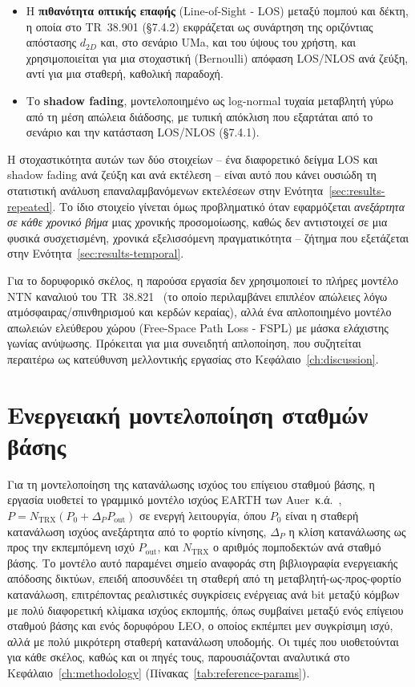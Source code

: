 \begin{itemize}
  \item Η \textbf{πιθανότητα οπτικής επαφής} (Line-of-Sight - LOS) μεταξύ
    πομπού και δέκτη, η οποία στο TR~38.901 (§7.4.2) εκφράζεται ως
    συνάρτηση της οριζόντιας απόστασης $d_{2D}$ και, στο σενάριο UMa, και
    του ύψους του χρήστη, και χρησιμοποιείται για μια στοχαστική
    (Bernoulli) απόφαση LOS/NLOS ανά ζεύξη, αντί για μια σταθερή, καθολική
    παραδοχή.
  \item Το \textbf{shadow fading}, μοντελοποιημένο ως log-normal
    τυχαία μεταβλητή γύρω από τη μέση απώλεια διάδοσης, με τυπική απόκλιση
    που εξαρτάται από το σενάριο και την κατάσταση LOS/NLOS (§7.4.1).
\end{itemize}

Η στοχαστικότητα αυτών των δύο στοιχείων -- ένα διαφορετικό δείγμα LOS και
shadow fading ανά ζεύξη και ανά εκτέλεση -- είναι αυτό που κάνει
ουσιώδη τη στατιστική ανάλυση επαναλαμβανόμενων εκτελέσεων στην
Ενότητα~\ref{sec:results-repeated}. Το ίδιο στοιχείο γίνεται όμως
προβληματικό όταν εφαρμόζεται \emph{ανεξάρτητα σε κάθε χρονικό βήμα} μιας
χρονικής προσομοίωσης, καθώς δεν αντιστοιχεί σε μια φυσικά συσχετισμένη,
χρονικά εξελισσόμενη πραγματικότητα -- ζήτημα που εξετάζεται στην
Ενότητα~\ref{sec:results-temporal}.

Για το δορυφορικό σκέλος, η παρούσα εργασία δεν χρησιμοποιεί το πλήρες
μοντέλο NTN καναλιού του TR~38.821~\cite{tr38821} (το οποίο περιλαμβάνει
επιπλέον απώλειες λόγω ατμόσφαιρας/σπινθηρισμού και κερδών κεραίας), αλλά
ένα απλοποιημένο μοντέλο απωλειών ελεύθερου χώρου (Free-Space Path Loss -
FSPL) με μάσκα ελάχιστης γωνίας ανύψωσης. Πρόκειται για μια συνειδητή
απλοποίηση, που συζητείται περαιτέρω ως κατεύθυνση μελλοντικής εργασίας
στο Κεφάλαιο~\ref{ch:discussion}.

\section{Ενεργειακή μοντελοποίηση σταθμών βάσης}
\label{sec:bg-energy-model}

Για τη μοντελοποίηση της κατανάλωσης ισχύος του επίγειου σταθμού βάσης, η
εργασία υιοθετεί το γραμμικό μοντέλο ισχύος EARTH των
Auer~κ.ά.~\cite{auer2011earth}, $P = N_{\text{TRX}}(P_0 + \Delta_P
P_{\text{out}})$ σε ενεργή λειτουργία, όπου $P_0$ είναι η σταθερή
κατανάλωση ισχύος ανεξάρτητα από το φορτίο κίνησης, $\Delta_P$ η κλίση
κατανάλωσης ως προς την εκπεμπόμενη ισχύ $P_{\text{out}}$, και
$N_{\text{TRX}}$ ο αριθμός πομποδεκτών ανά σταθμό βάσης. Το μοντέλο αυτό
παραμένει σημείο αναφοράς στη βιβλιογραφία ενεργειακής απόδοσης δικτύων,
επειδή αποσυνδέει τη σταθερή από τη μεταβλητή-ως-προς-φορτίο κατανάλωση,
επιτρέποντας ρεαλιστικές συγκρίσεις ενέργειας ανά bit μεταξύ κόμβων με
πολύ διαφορετική κλίμακα ισχύος εκπομπής, όπως συμβαίνει μεταξύ ενός
επίγειου σταθμού βάσης και ενός δορυφόρου LEO, ο οποίος εκπέμπει μεν
συγκρίσιμη ισχύ, αλλά με πολύ μικρότερη σταθερή κατανάλωση υποδομής. Οι
τιμές που υιοθετούνται για κάθε σκέλος, καθώς και οι πηγές τους,
παρουσιάζονται αναλυτικά στο Κεφάλαιο~\ref{ch:methodology}
(Πίνακας~\ref{tab:reference-params}).

